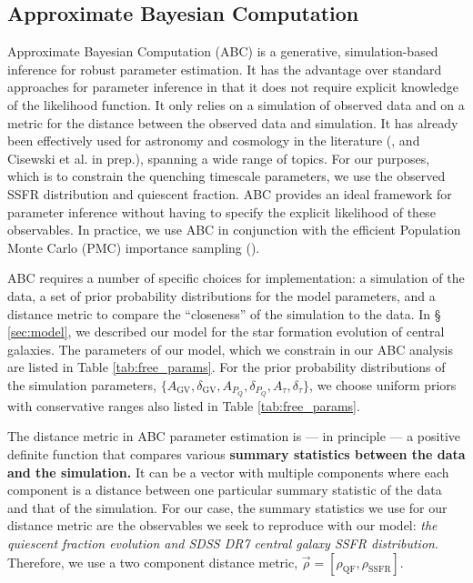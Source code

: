 \documentclass[iop,apj,tighten,twocolappendix,numberedappendix]{emulateapj}
\begin{document}
\subsection{Approximate Bayesian Computation} \label{sec:abc}
Approximate Bayesian Computation (ABC) is a generative, 
simulation-based inference for robust parameter estimation. 
It has the advantage over standard approaches for parameter 
inference in that it does not require explicit knowledge 
of the likelihood function. It only relies on a simulation 
of observed data and on a metric for the distance between 
the observed data and simulation. It has already been 
effectively used for astronomy and cosmology in the literature 
(\citealt{Cameron:2012aa, Weyant:2013aa, Akeret:2015aa, 
Ishida:2015aa, Lin:2015aa, Lin:2016aa, Hahn:2016aa}, and 
Cisewski et al. in prep.), spanning a wide range of topics.
For our purposes, which is to constrain the quenching timescale 
parameters, we use the observed SSFR distribution and quiescent 
fraction. ABC provides an ideal framework for parameter inference 
without having to specify the explicit likelihood of these 
observables. In practice, we use 
ABC in conjunction with the efficient 
Population Monte Carlo (PMC) importance sampling 
(\citealt{Ishida:2015aa, Hahn:2016aa}). 

ABC requires a number of specific choices for implementation: a 
simulation of the data, a set of prior probability distributions 
for the model parameters, and a distance metric to compare the 
``closeness'' of the simulation to the data. In \S 
\ref{sec:model}, we described our model for the star formation 
evolution of central galaxies. The parameters of our model, which we 
constrain in our ABC analysis are listed in Table \ref{tab:free_params}. 
For the prior probability distributions of the simulation parameters, 
$\{A_\mathrm{GV}, \delta_\mathrm{GV}, A_{P_Q}, \delta_{P_Q}, A_\tau, 
\delta_\tau \}$, we choose uniform priors with conservative ranges also 
listed in Table \ref{tab:free_params}. 

The distance metric in ABC parameter estimation is --- in principle --- a
positive definite function that compares various 
{
\color{dred} \bf summary statistics between the data and the simulation.
} 
It can be a vector with multiple 
components where each component is a distance between one particular 
summary statistic of the data and that of the simulation. For our case, 
the summary statistics we use for our distance metric are the observables
we seek to reproduce with our model: {\em the quiescent fraction evolution and 
SDSS DR7 central galaxy SSFR distribution}. Therefore, we use a two component 
distance metric, $\vec\rho = [\rho_\mathrm{QF}, \rho_\mathrm{SSFR}]$. 
\end{document}
